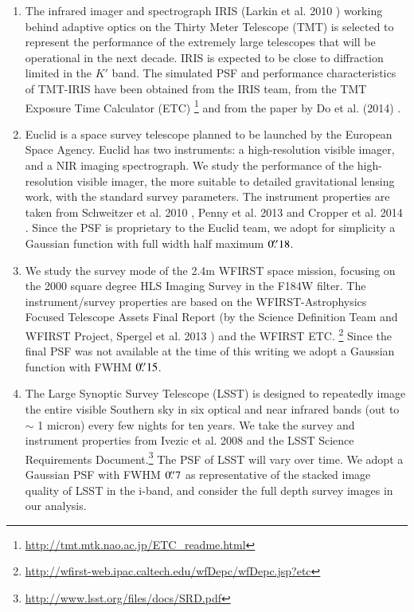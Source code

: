 \documentclass[a4paper,11pt]{article}
\begin{document}
{\begin{enumerate}
\item The infrared imager and spectrograph IRIS (Larkin et al. 2010
\citep{2010SPIE.7735E..29L}) working behind adaptive optics on the
Thirty Meter Telescope (TMT) is selected to represent the performance
of the extremely large telescopes that will be operational in the next
decade. IRIS is expected to be close to diffraction limited in the
$K'$ band. The simulated PSF and performance characteristics of
TMT-IRIS have been obtained from the IRIS team, from the TMT Exposure
Time Calculator (ETC)
\footnote{\url{http://tmt.mtk.nao.ac.jp/ETC_readme.html}} and from the
paper by Do et al. (2014) \citep{2014AJ....147...93D}.

\item Euclid is a space survey telescope planned to be launched by the
European Space Agency. Euclid has two instruments: a high-resolution
visible imager, and a NIR imaging spectrograph. We study the performance
of the high-resolution visible imager, the more suitable to detailed
gravitational lensing work, with the standard survey parameters.  The
instrument properties are taken from Schweitzer et al. 2010
\cite{2010SPIE.7731E..1KS}, Penny et al. 2013
\cite{2013MNRAS.434....2P} and Cropper et al. 2014
\cite{2014SPIE.9143E..0JC}. Since the PSF is proprietary to the Euclid
team, we adopt for simplicity a Gaussian function with full width half
maximum $0\hbox{$.\!\!^{\prime\prime}$}18$.

\item We study the survey mode of the 2.4m WFIRST space mission,
focusing on the 2000 square degree HLS Imaging Survey in the F184W
filter. The instrument/survey properties are based on the
WFIRST-Astrophysics Focused Telescope Assets Final Report (by the
Science Definition Team and WFIRST Project, Spergel et al. 2013
\cite{2013arXiv1305.5422S}) and the WFIRST ETC.
\footnote{\url{http://wfirst-web.ipac.caltech.edu/wfDepc/wfDepc.jsp?etc}}
Since the final PSF was not available at the time of this writing we
adopt a Gaussian function with FWHM $0\hbox{$.\!\!^{\prime\prime}$}15$.

\item The Large Synoptic Survey Telescope (LSST) is designed to
repeatedly image the entire visible Southern sky in six optical and
near infrared bands (out to $\sim$ 1 micron) every few nights for ten
years. We take the survey and instrument properties from Ivezic et
al. 2008 \cite{2008arXiv0805.2366I} and the LSST Science Requirements
Document.\footnote{\url{http://www.lsst.org/files/docs/SRD.pdf}} The
PSF of LSST will vary over time. We adopt a Gaussian PSF with FWHM
$0\hbox{$.\!\!^{\prime\prime}$}7$ as representative of the stacked image quality of LSST in
the i-band, and consider the full depth survey images in our analysis.


\end{enumerate}}
\end{document}
